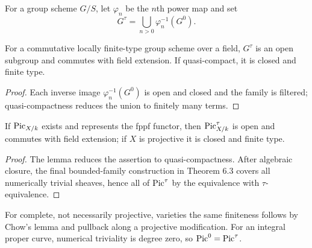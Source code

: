 \begin{definition}\label{kps-def-torsion-component}
For a group scheme $G/S$, let $\varphi_n$ be the $n$th power map and set
\[G^\tau=\bigcup_{n>0}\varphi_n^{-1}(G^0).\]
\end{definition}
\begin{lemma}\label{kps-lem-torsion-component}
For a commutative locally finite-type group scheme over a field, $G^\tau$ is
an open subgroup and commutes with field extension. If quasi-compact, it is
closed and finite type.
\end{lemma}
\begin{proof}
Each inverse image $\varphi_n^{-1}(G^0)$ is open and closed and the family is
filtered; quasi-compactness reduces the union to finitely many terms.
\end{proof}

\begin{proposition}\label{kps-prop-pict-field}
If $\operatorname{Pic}_{X/k}$ exists and represents the fppf functor, then $\operatorname{Pic}^\tau_{X/k}$
is open and commutes with field extension; if $X$ is projective it is closed
and finite type.
\end{proposition}
\begin{proof}
The lemma reduces the assertion to quasi-compactness. After algebraic closure,
the final bounded-family construction in Theorem 6.3 covers all numerically
trivial sheaves, hence all of $\operatorname{Pic}^\tau$ by the equivalence with $\tau$-equivalence.
\end{proof}

\begin{remark}\label{kps-rmk-pict-field}
For complete, not necessarily projective, varieties the same finiteness follows
by Chow's lemma and pullback along a projective modification. For an integral
proper curve, numerical triviality is degree zero, so $\operatorname{Pic}^0=\operatorname{Pic}^\tau$.
\end{remark}


